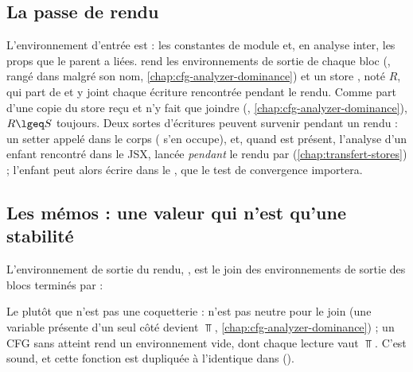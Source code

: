 \subsection{La passe de rendu}


L'environnement d'entrée est  : les constantes de module et,
en analyse inter, les props que le parent a liées.  rend les
environnements de sortie de chaque bloc (, rangé dans
 malgré son nom, \cref{chap:cfg-analyzer-dominance})
et un store , noté $R$, qui part de
 et y joint chaque écriture rencontrée pendant le rendu.
Comme  part d'une copie du store reçu et n'y fait que
joindre (,
\cref{chap:cfg-analyzer-dominance}), $R \lgeq S$ toujours.
Deux sortes d'écritures peuvent survenir pendant un rendu : un setter appelé
dans le corps ( s'en occupe), et, quand 
est présent, l'analyse d'un enfant  rencontré dans le JSX,
lancée \emph{pendant} le rendu par 
(\cref{chap:transfert-stores}) ; l'enfant peut alors écrire dans le
, que le test de convergence importera.

\subsection{Les mémos : une valeur qui n'est qu'une stabilité}
\label{sec:point-fixe-composant-memos}


L'environnement de sortie du rendu, , est le join des
environnements de sortie des blocs terminés par  :


Le  plutôt que  n'est pas une
coquetterie :  n'est pas neutre pour le join
(une variable présente d'un seul côté devient $\Top$,
\cref{chap:cfg-analyzer-dominance}) ; un CFG sans 
atteint rend un environnement vide, dont chaque lecture vaut $\Top$. C'est
sound, et cette fonction est dupliquée à l'identique dans
 ().

